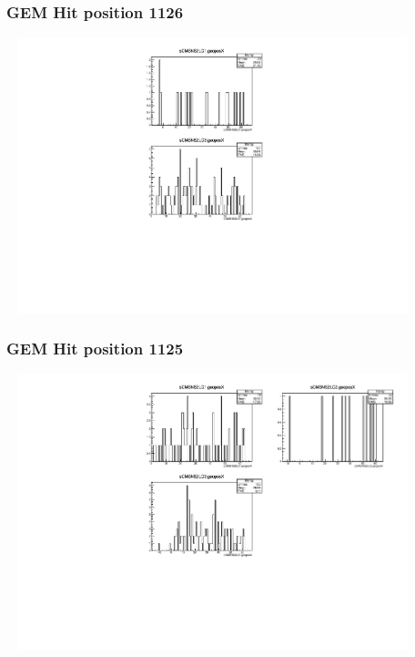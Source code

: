 \documentclass[slidestop,compress,mathserif]{beamer}
\begin{document}
\begin{frame}\frametitle{GEM Hit position 1126}
	 \includegraphics[width=12cm,height=8cm]{GEM_Hit_position_1126.pdf}
\end{frame}
\begin{frame}\frametitle{GEM Hit position 1125}
	 \includegraphics[width=12cm,height=8cm]{GEM_Hit_position_1125.pdf}
\end{frame}
\end{document}
